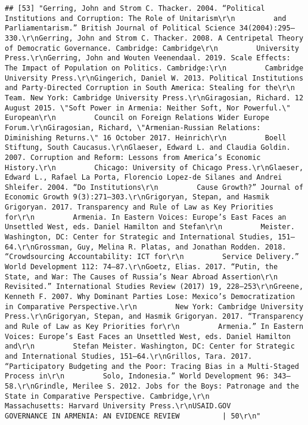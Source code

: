 \documentclass[
]{article}
\begin{document}
\begin{verbatim}
## [53] "Gerring, John and Strom C. Thacker. 2004. “Political Institutions and Corruption: The Role of Unitarism\r\n         and Parliamentarism.” British Journal of Political Science 34(2004):295–330.\r\nGerring, John and Strom C. Thacker. 2008. A Centripetal Theory of Democratic Governance. Cambridge: Cambridge\r\n         University Press.\r\nGerring, John and Wouten Veenendaal. 2019. Scale Effects: The Impact of Population on Politics. Cambridge:\r\n         Cambridge University Press.\r\nGingerich, Daniel W. 2013. Political Institutions and Party-Directed Corruption in South America: Stealing for the\r\n         Team. New York: Cambridge University Press.\r\nGiragosian, Richard. 12 August 2015. \"Soft Power in Armenia: Neither Soft, Nor Powerful.\" European\r\n         Council on Foreign Relations Wider Europe Forum.\r\nGiragosian, Richard, \"Armenian-Russian Relations: Diminishing Returns.\" 16 October 2017. Heinrich\r\n         Boell Stiftung, South Caucasus.\r\nGlaeser, Edward L. and Claudia Goldin. 2007. Corruption and Reform: Lessons from America’s Economic History.\r\n         Chicago: University of Chicago Press.\r\nGlaeser, Edward L., Rafael La Porta, Florencio Lopez-de Silanes and Andrei Shleifer. 2004. “Do Institutions\r\n         Cause Growth?” Journal of Economic Growth 9(3):271–303.\r\nGrigoryan, Stepan, and Hasmik Grigoryan. 2017. Transparency and Rule of Law as Key Priorities for\r\n         Armenia. In Eastern Voices: Europe’s East Faces an Unsettled West, eds. Daniel Hamilton and Stefan\r\n         Meister. Washington, DC: Center for Strategic and International Studies, 151–64.\r\nGrossman, Guy, Melina R. Platas, and Jonathan Rodden. 2018. “Crowdsourcing Accountability: ICT for\r\n         Service Delivery.” World Development 112: 74–87.\r\nGoetz, Elias. 2017. “Putin, the State, and War: The Causes of Russia’s Near Abroad Assertion\r\n         Revisited.” International Studies Review (2017) 19, 228–253\r\nGreene, Kenneth F. 2007. Why Dominant Parties Lose: Mexico’s Democratization in Comparative Perspective.\r\n         New York: Cambridge University Press.\r\nGrigoryan, Stepan, and Hasmik Grigoryan. 2017. “Transparency and Rule of Law as Key Priorities for\r\n         Armenia.” In Eastern Voices: Europe’s East Faces an Unsettled West, eds. Daniel Hamilton and\r\n         Stefan Meister. Washington, DC: Center for Strategic and International Studies, 151–64.\r\nGrillos, Tara. 2017. “Participatory Budgeting and the Poor: Tracing Bias in a Multi-Staged Process in\r\n         Solo, Indonesia.” World Development 96: 343–58.\r\nGrindle, Merilee S. 2012. Jobs for the Boys: Patronage and the State in Comparative Perspective. Cambridge,\r\n         Massachusetts: Harvard University Press.\r\nUSAID.GOV                                                     GOVERNANCE IN ARMENIA: AN EVIDENCE REVIEW          | 50\r\n"                                                                                                                                                                                                                                                                                                                                                                                                                                                          
\end{verbatim}
\end{document}
